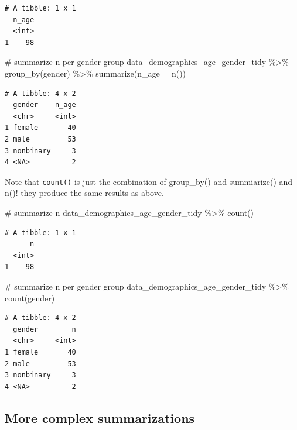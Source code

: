 \documentclass[
  letterpaper,
  DIV=11,
  numbers=noendperiod]{scrreprt}
\newenvironment{Shaded}{\begin{snugshade}}{\end{snugshade}}
\newcommand{\AttributeTok}[1]{\textcolor[rgb]{0.40,0.45,0.13}{#1}}
\newcommand{\CommentTok}[1]{\textcolor[rgb]{0.37,0.37,0.37}{#1}}
\newcommand{\FunctionTok}[1]{\textcolor[rgb]{0.28,0.35,0.67}{#1}}
\newcommand{\NormalTok}[1]{\textcolor[rgb]{0.00,0.23,0.31}{#1}}
\newcommand{\SpecialCharTok}[1]{\textcolor[rgb]{0.37,0.37,0.37}{#1}}
\begin{document}
\begin{verbatim}
# A tibble: 1 x 1
  n_age
  <int>
1    98
\end{verbatim}

\begin{Shaded}
\begin{Highlighting}[]
\CommentTok{\# summarize n per gender group}
\NormalTok{data\_demographics\_age\_gender\_tidy }\SpecialCharTok{\%\textgreater{}\%}
  \FunctionTok{group\_by}\NormalTok{(gender) }\SpecialCharTok{\%\textgreater{}\%}
  \FunctionTok{summarize}\NormalTok{(}\AttributeTok{n\_age =} \FunctionTok{n}\NormalTok{())}
\end{Highlighting}
\end{Shaded}

\begin{verbatim}
# A tibble: 4 x 2
  gender    n_age
  <chr>     <int>
1 female       40
2 male         53
3 nonbinary     3
4 <NA>          2
\end{verbatim}

Note that \texttt{count()} is just the combination of group\_by() and
summiarize() and n()! they produce the same results as above.

\begin{Shaded}
\begin{Highlighting}[]
\CommentTok{\# summarize n}
\NormalTok{data\_demographics\_age\_gender\_tidy }\SpecialCharTok{\%\textgreater{}\%}
  \FunctionTok{count}\NormalTok{()}
\end{Highlighting}
\end{Shaded}

\begin{verbatim}
# A tibble: 1 x 1
      n
  <int>
1    98
\end{verbatim}

\begin{Shaded}
\begin{Highlighting}[]
\CommentTok{\# summarize n per gender group}
\NormalTok{data\_demographics\_age\_gender\_tidy }\SpecialCharTok{\%\textgreater{}\%}
  \FunctionTok{count}\NormalTok{(gender)}
\end{Highlighting}
\end{Shaded}

\begin{verbatim}
# A tibble: 4 x 2
  gender        n
  <chr>     <int>
1 female       40
2 male         53
3 nonbinary     3
4 <NA>          2
\end{verbatim}

\subsection{More complex
summarizations}\label{more-complex-summarizations}
\end{document}
